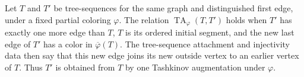 \begin{definition}
Let $T$ and $T'$ be tree-sequences for the same graph and distinguished
first edge, under a fixed partial coloring $\varphi$.  The relation
$\operatorname{TA}_{\varphi}(T,T')$ holds when $T'$ has exactly one more
edge than $T$, $T$ is its ordered initial segment, and the new last edge of
$T'$ has a color in $\overline\varphi(T)$.  The tree-sequence attachment
and injectivity data then say that this new edge joins its new outside
vertex to an earlier vertex of $T$.  Thus $T'$ is obtained from $T$ by one
Tashkinov augmentation under $\varphi$.
\end{definition}
